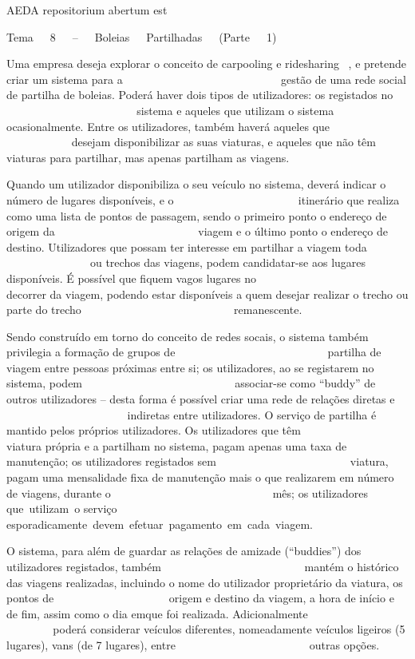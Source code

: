 A\+E\+D\+A repositorium abertum est

Tema   8   –   \+Boleias   \+Partilhadas   (Parte   1) 

Uma empresa deseja explorar o conceito de carpooling e ridesharing  , e pretende criar um sistema para a                                  gestão de uma rede social de partilha de boleias. Poderá haver dois tipos de utilizadores\+: os registados no                               sistema e aqueles que utilizam o sistema ocasionalmente. Entre os utilizadores, também haverá aqueles que                               desejam disponibilizar as suas viaturas, e aqueles que não têm viaturas para partilhar, mas apenas partilham as viagens.\+ 

Quando um utilizador disponibiliza o seu veículo no sistema, deverá indicar o número de lugares disponíveis, e o                           itinerário que realiza como uma lista de pontos de passagem, sendo o primeiro ponto o endereço de origem da                               viagem e o último ponto o endereço de destino. Utilizadores que possam ter interesse em partilhar a viagem toda                           ou trechos das viagens, podem candidatar-\/se aos lugares disponíveis. É possível que fiquem vagos lugares no                               decorrer da viagem, podendo estar disponíveis a quem desejar realizar o trecho ou parte do trecho                                 remanescente.\+ 

Sendo construído em torno do conceito de redes socais, o sistema também privilegia a formação de grupos de                                 partilha de viagem entre pessoas próximas entre si; os utilizadores, ao se registarem no sistema, podem                                 associar-\/se como “buddy” de outros utilizadores – desta forma é possível criar uma rede de relações diretas e                             indiretas entre utilizadores. O serviço de partilha é mantido pelos próprios utilizadores. Os utilizadores que têm                   viatura própria e a partilham no sistema, pagam apenas uma taxa de manutenção; os utilizadores registados sem                             viatura, pagam uma mensalidade fixa de manutenção mais o que realizarem em número de viagens, durante o                                   mês; os utilizadores que utilizam o serviço esporadicamente devem efetuar pagamento em cada viagem.

O sistema, para além de guardar as relações de amizade (“buddies”) dos utilizadores registados, também                               mantém o histórico das viagens realizadas, incluindo o nome do utilizador proprietário da viatura, os pontos de                         origem e destino da viagem, a hora de início e de fim, assim como o dia emque foi realizada. Adicionalmente                               poderá considerar veículos diferentes, nomeadamente veículos ligeiros (5 lugares), vans (de 7 lugares), entre                             outras opções.\+  